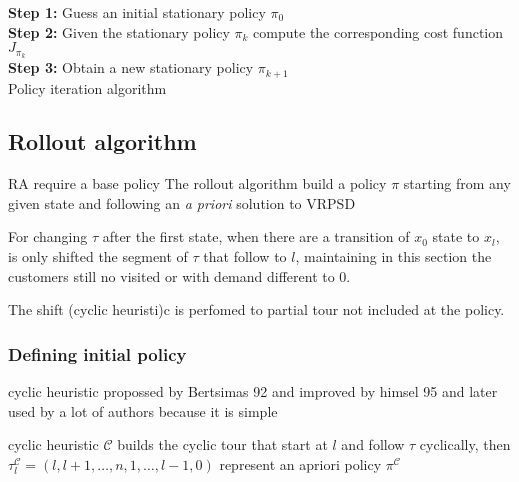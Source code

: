 \begin{algorithm}
 \textbf{Step 1:} Guess an initial stationary policy $\pi_0$\\
 \textbf{Step 2:} Given the stationary policy $\pi_k$ compute the corresponding cost function $J_{\pi_k}$\\
 \textbf{Step 3:} Obtain a new stationary policy $\pi_{k+1}$\\
 \caption{Policy iteration algorithm}\label{algo:policy_iteration_general}
\end{algorithm}




\subsection{Rollout algorithm}

RA require a base policy
The rollout algorithm build a policy $\pi$ starting from any given state and following an \textit{a priori} solution to VRPSD

For changing $\tau$ after the first state, when there are a transition of $x_0$ state to $x_l$, is only shifted the segment of $\tau$ that follow to $l$, maintaining in this section the customers still no visited or with demand different to $0$.

The shift (cyclic heuristi)c is perfomed to partial tour not included at the policy.


\subsubsection{Defining initial policy}\label{sec:initial_policy}


cyclic heuristic propossed by Bertsimas 92  and improved by himsel 95 and later used by a lot of authors because it is simple 

cyclic heuristic $\mathcal{C}$ builds the cyclic tour that start at $l$ and follow $\tau$ cyclically, then $\tau^\mathcal{C}_l = (l, l+1, \ldots , n , 1 , \ldots , l-1, 0)$ represent an apriori policy $\pi^\mathcal{C}$





